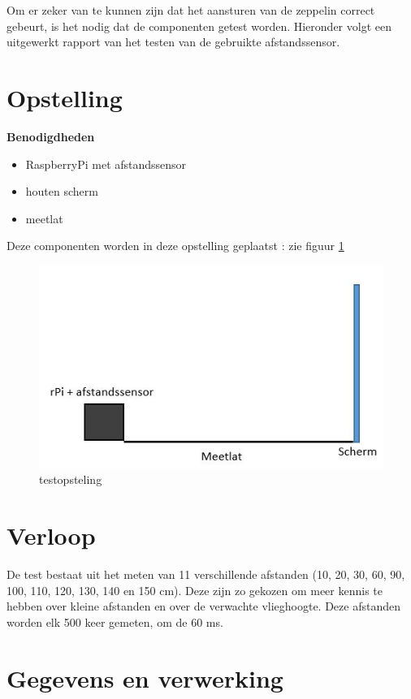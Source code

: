 \documentclass{peno-opdracht3}
\begin{document}
\maketitle
Om er zeker van te kunnen zijn dat het aansturen van de zeppelin correct gebeurt, is het nodig dat de componenten getest worden. Hieronder volgt een uitgewerkt rapport van het testen van de gebruikte afstandssensor.\\
\section{Opstelling}
\textbf{Benodigdheden}
\begin{itemize}
	\item RaspberryPi met afstandssensor
	\item houten scherm
	\item meetlat
\end{itemize}
Deze componenten worden in deze opstelling geplaatst : zie figuur \ref{opstelling}
\begin{figure}[ht!]%
\centering
\includegraphics[scale=0.6]{opstelling.jpg}%
\caption{testopsteling}%
\label{opstelling}%
\end{figure}
\section{Verloop}
De test bestaat uit het meten van 11 verschillende afstanden (10, 20, 30, 60, 90, 100, 110, 120, 130, 140 en 150 cm). Deze zijn zo gekozen om meer kennis te hebben over kleine afstanden en over de verwachte vlieghoogte. Deze afstanden worden elk 500 keer gemeten, om de 60 ms. 

\section{Gegevens en verwerking}
\end{document}
